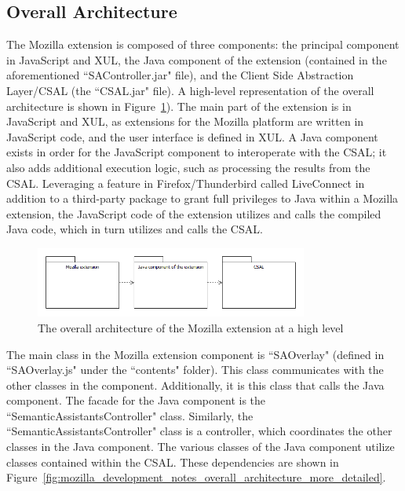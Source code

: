 \subsection{Overall Architecture}
The Mozilla extension is composed of three components: the principal component in JavaScript and XUL, the Java component of the extension (contained in the aforementioned ``SAController.jar" file), and the Client Side Abstraction Layer/CSAL (the ``CSAL.jar" file). A high-level representation of the overall architecture is shown in Figure~\ref{fig:mozilla_development_notes_overall_architecture_high_level}).
The main part of the extension is in JavaScript and XUL, as extensions for the Mozilla platform are written in JavaScript code, and the user interface is defined in XUL. A Java component exists in order for the JavaScript component to interoperate with the CSAL; it also adds additional execution logic, such as processing the results from the CSAL. Leveraging a feature in Firefox/Thunderbird called LiveConnect in addition to a third-party package to grant full privileges to Java within a Mozilla extension, the JavaScript code of the extension utilizes and calls the compiled Java code, which in turn utilizes and calls the CSAL. 

\begin{figure}[htb]
  \centering
  \includegraphics[width=0.8\textwidth]{pictures/mozilla_development_notes_overall_architecture_high_level.png}
  \caption{The overall architecture of the Mozilla extension at a high level}
  \label{fig:mozilla_development_notes_overall_architecture_high_level}
\end{figure}

The main class in the Mozilla extension component is ``SAOverlay" (defined in ``SAOverlay.js" under the ``contents" folder). This class communicates with the other classes in the component. Additionally, it is this class that calls the Java component. The facade for the Java component is the ``SemanticAssistantsController" class. Similarly, the ``SemanticAssistantsController" class is a controller, which coordinates the other classes in the Java component. The various classes of the Java component utilize classes contained within the CSAL. These dependencies are shown in Figure~\ref{fig:mozilla_development_notes_overall_architecture_more_detailed}.

